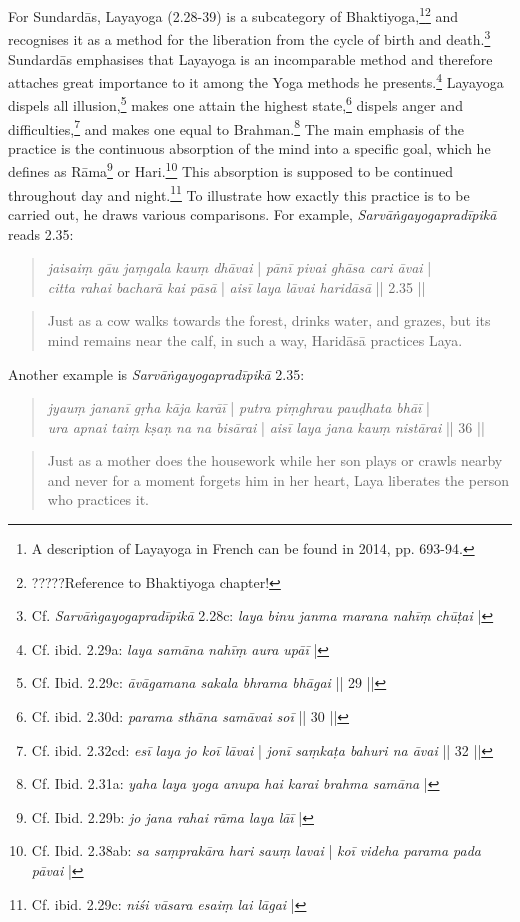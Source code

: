 For Sundardās, Layayoga (2.28-39) is a subcategory of Bhaktiyoga,\footnote{A description of Layayoga in French can be found in \citeauthor{burger2014sarvangayogapradipika} 2014, pp. 693-94.}\footnote{?????Reference to Bhaktiyoga chapter!} and recognises it as a method for the liberation from the cycle of birth and death.\footnote{Cf. \textit{Sarvāṅgayogapradīpikā} 2.28c: \textit{laya binu janma marana nahīṃ chūṭai} |} Sundardās emphasises that Layayoga is an incomparable method and therefore attaches great importance to it among the Yoga methods he presents.\footnote{Cf. ibid. 2.29a: \textit{laya samāna nahīṃ aura upāī} |} Layayoga dispels all illusion,\footnote{Cf. Ibid. 2.29c: \textit{āvāgamana sakala bhrama bhāgai} || 29 ||} makes one attain the highest state,\footnote{Cf. ibid. 2.30d: \textit{parama sthāna samāvai soī} || 30 ||} dispels anger and difficulties,\footnote{Cf. ibid. 2.32cd: \textit{esī laya jo koī lāvai} | \textit{jonī saṃkaṭa bahuri na āvai} || 32 ||} and makes one equal to Brahman.\footnote{Cf. Ibid. 2.31a: \textit{yaha laya yoga anupa hai karai brahma samāna} |} The main emphasis of the practice is the continuous absorption of the mind into a specific goal, which he defines as Rāma\footnote{Cf. Ibid. 2.29b: \textit{jo jana rahai rāma laya lāī} |} or Hari.\footnote{Cf. Ibid. 2.38ab: \textit{sa saṃprakāra hari sauṃ lavai} | \textit{koī videha parama pada pāvai} |} This absorption is supposed to be continued throughout day and night.\footnote{Cf. ibid. 2.29c: \textit{niśi vāsara esaiṃ lai lāgai} |} To illustrate how exactly this practice is to be carried out, he draws various comparisons. For example, \textit{Sarvāṅgayogapradīpikā} reads 2.35: 

\begin{quote}
\textit{jaisaiṃ gāu jaṃgala kauṃ dhāvai} | \textit{pānī pivai ghāsa cari āvai} |\\ 
\textit{citta rahai bacharā kai pāsā} | \textit{aisī laya lāvai haridāsā} || 2.35 ||
\end{quote}
\begin{quote}
  Just as a cow walks towards the forest, drinks water, and grazes, but its mind remains near the calf, in such a way, Haridāsā practices Laya.
\end{quote}

Another example is \textit{Sarvāṅgayogapradīpikā} 2.35:

\begin{quote}
\textit{jyauṃ jananī gṛha kāja karāī} | \textit{putra piṃghrau pauḍhata bhāī} |\\
\textit{ura apnai taiṃ kṣaṇ na na bisārai} | \textit{aisī laya jana kauṃ nistārai} || 36 ||
\end{quote}
\begin{quote}
Just as a mother does the housework while her son plays or crawls nearby and never for a moment forgets him in her heart, Laya liberates the person who practices it.
\end{quote}

